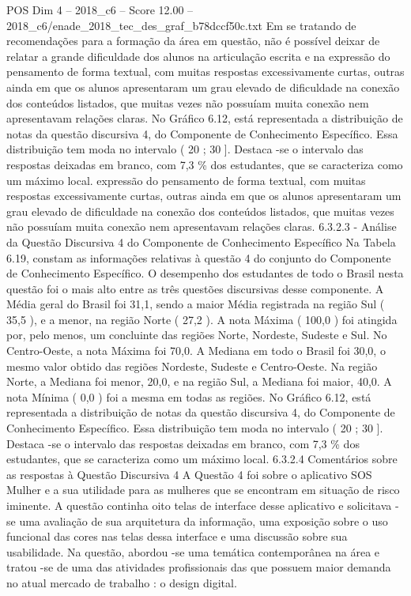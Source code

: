 \begin{textsample}{POS Dim 4 – 2018\_c6 – Score 12.00 – 2018\_c6/enade\_2018\_tec\_des\_graf\_b78dccf50c.txt}
Em se tratando de recomendações para a formação da área em questão, não é possível deixar de relatar a grande dificuldade dos alunos na articulação escrita e na expressão do pensamento de forma textual, com muitas respostas excessivamente curtas, outras ainda em que os alunos apresentaram um grau elevado de dificuldade na conexão dos conteúdos listados, que muitas vezes não possuíam muita conexão nem apresentavam relações claras.
No Gráfico 6.12, está representada a distribuição de notas da questão discursiva 4, do Componente de Conhecimento Específico.
Essa distribuição tem moda no intervalo ( 20 ; 30 ].
Destaca -se o intervalo das respostas deixadas em branco, com 7,3 \% dos estudantes, que se caracteriza como um máximo local. expressão do pensamento de forma textual, com muitas respostas excessivamente curtas, outras ainda em que os alunos apresentaram um grau elevado de dificuldade na conexão dos conteúdos listados, que muitas vezes não possuíam muita conexão nem apresentavam relações claras. 6.3.2.3 - Análise da Questão Discursiva 4 do Componente de Conhecimento Específico Na Tabela 6.19, constam as informações relativas à questão 4 do conjunto do Componente de Conhecimento Específico.
O desempenho dos estudantes de todo o Brasil nesta questão foi o mais alto entre as três questões discursivas desse componente.
A Média geral do Brasil foi 31,1, sendo a maior Média registrada na região Sul ( 35,5 ), e a menor, na região Norte ( 27,2 ).
A nota Máxima ( 100,0 ) foi atingida por, pelo menos, um concluinte das regiões Norte, Nordeste, Sudeste e Sul.
No Centro-Oeste, a nota Máxima foi 70,0.
A Mediana em todo o Brasil foi 30,0, o mesmo valor obtido das regiões Nordeste, Sudeste e Centro-Oeste.
Na região Norte, a Mediana foi menor, 20,0, e na região Sul, a Mediana foi maior, 40,0.
A nota Mínima ( 0,0 ) foi a mesma em todas as regiões.
No Gráfico 6.12, está representada a distribuição de notas da questão discursiva 4, do Componente de Conhecimento Específico.
Essa distribuição tem moda no intervalo ( 20 ; 30 ].
Destaca -se o intervalo das respostas deixadas em branco, com 7,3 \% dos estudantes, que se caracteriza como um máximo local. 6.3.2.4 Comentários sobre as respostas à Questão Discursiva 4 A Questão 4 foi sobre o aplicativo SOS Mulher e a sua utilidade para as mulheres que se encontram em situação de risco iminente.
A questão continha oito telas de interface desse aplicativo e solicitava -se uma avaliação de sua arquitetura da informação, uma exposição sobre o uso funcional das cores nas telas dessa interface e uma discussão sobre sua usabilidade.
Na questão, abordou -se uma temática contemporânea na área e tratou -se de uma das atividades profissionais das que possuem maior demanda no atual mercado de trabalho : o design digital.

\end{textsample}
